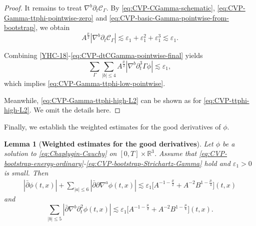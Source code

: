 \documentclass[11pt,twoside]{article}
\def\f{\frac}
\def\p{\partial}
\def\ve{\varepsilon}
\def\ls{\lesssim}
\theoremstyle{plain}
\newtheorem{lemma}[theorem]{Lemma}
\theoremstyle{definition}
\theoremstyle{assumption}
\numberwithin{equation}{section}
\begin{document}
\begin{proof}
		It remains to treat \(\nabla^b\p_t\mathcal C_\Gamma\). By
		\eqref{eq:CVP-CGamma-schematic},
		\eqref{eq:CVP-Gamma-ttphi-pointwise-zero} and
		\eqref{eq:CVP-basic-Gamma-pointwise-from-bootstrap},
		we obtain
		\begin{equation}\label{eq:CVP-dtCGamma-pointwise-final}
			A^{\frac{\mu}{2}}
			|\nabla^b\p_t\mathcal C_\Gamma|
			\ls
			\ve_1+\ve_1^2+\ve_1^3
			\ls
			\ve_1.
		\end{equation}
		
		Combining \eqref{YHC-18}-\eqref{eq:CVP-dtCGamma-pointwise-final} yields
			\begin{equation}\label{eq:CVP-Gamma-tttphi-pointwise}
			\sum_{\Gamma}
			\sum_{|b|\le 4}
			A^{\frac{\mu}{2}}
			|\nabla^b\p_t^3\Gamma\phi|
			\ls
			\ve_1,
		\end{equation}
		which implies \eqref{eq:CVP-Gamma-ttphi-low-pointwise}.
		
		Meanwhile,  \eqref{eq:CVP-Gamma-ttphi-high-L2} can be shown as for \eqref{eq:CVP-ttphi-high-L2}. We omit
the details here.
	\end{proof}

	
	
	
Finally, we establish the weighted estimates for the good derivatives of $\phi$.
	
	
	\begin{lemma}[{\bf Weighted estimates for the good derivatives}]
		\label{lem:CVP-derived-good-derivative-estimates}
		Let \(\phi\) be a solution to \eqref{eq:Chaplygin-Cauchy}
		on \([0,T]\times\mathbb R^3\).
		Assume that
		\eqref{eq:CVP-bootstrap-energy-ordinary}-\eqref{eq:CVP-bootstrap-Strichartz-Gamma} hold and
		$\ve_1>0$ is small. Then
		\begin{equation}
			\label{eq:CVP-derived-good-derivative-estimates}
			\begin{aligned}
				|\bar{\p}\phi(t,x)|
				+\sum_{|a|\le 6}|\bar{\p}\p\nabla^a\phi(t,x)|
				\ls
				\ve_1\big[A^{-1-\f\mu2}
				+A^{-2}B^{1-\f\mu4}\big](t,x)
			\end{aligned}
		\end{equation}
		and
		\begin{equation}
			\label{eq:CVP-ttphi-low-good}
			\sum_{|b|\le 5}
			|\bar{\p}\nabla^b\p_t^2\phi(t,x)|
			\ls
			\ve_1\big[A^{-1-\f\mu2}
			+A^{-2}
			B^{1-\f\mu4}\big](t,x).
		\end{equation}
	\end{lemma}
	
\end{document}
